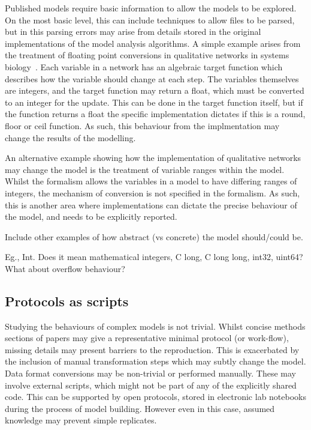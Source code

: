 \documentclass[conference]{IEEEtran}
\begin{document}
Published models require basic information to allow the models to be
explored. On the most basic level, this can include techniques to allow
files to be parsed, but in this parsing errors may arise from details 
stored in the original implementations of the model analysis algorithms.
A simple example arises from the treatment of floating point conversions
in qualitative networks in systems biology~\cite{Schaub2007}. Each
variable in a network has an algebraic target function which describes
how the variable should change at each step. The variables themselves are
integers, and the target function may return a float, which must be converted
to an integer for the update. This can be done in the target function 
itself, but if the function returns a float the specific implementation
dictates if this is a round, floor or ceil function. As such, this behaviour
from the implmentation may change the results of the modelling.

An alternative example showing how the implementation of qualitative networks
may change the model is the treatment of variable ranges within the model.
Whilst the formalism allows the variables in a model to have differing 
ranges of integers, the mechanism of conversion is not specified in the 
formalism. As such, this is another area where implementations can dictate
the precise behaviour of the model, and needs to be explicitly reported.

Include other examples of how abstract (vs concrete) the model should/could be. 

Eg., Int. Does it mean mathematical integers, C long, C long long, int32, uint64? 
What about overflow behaviour? 




\subsection{Protocols as scripts}



Studying the behaviours of complex models is not trivial. Whilst 
concise methods sections of papers may give a representative minimal
protocol (or work-flow), missing details may present barriers to 
the reproduction. This is exacerbated by the inclusion of manual 
transformation steps which may subtly change the model. Data format 
conversions may be non-trivial or performed manually. These may 
involve external scripts, which might not be part of any of the
explicitly shared code. This can be supported by open protocols, stored 
in electronic lab notebooks during the process of model building. However
even in this case, assumed knowledge may prevent simple replicates.
\end{document}

